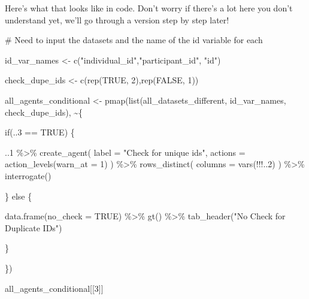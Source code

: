 \documentclass[
  letterpaper,
  DIV=11,
  numbers=noendperiod]{scrreprt}
\newenvironment{Shaded}{\begin{snugshade}}{\end{snugshade}}
\newcommand{\AttributeTok}[1]{\textcolor[rgb]{0.40,0.45,0.13}{#1}}
\newcommand{\CommentTok}[1]{\textcolor[rgb]{0.37,0.37,0.37}{#1}}
\newcommand{\ConstantTok}[1]{\textcolor[rgb]{0.56,0.35,0.01}{#1}}
\newcommand{\ControlFlowTok}[1]{\textcolor[rgb]{0.00,0.23,0.31}{#1}}
\newcommand{\DecValTok}[1]{\textcolor[rgb]{0.68,0.00,0.00}{#1}}
\newcommand{\FunctionTok}[1]{\textcolor[rgb]{0.28,0.35,0.67}{#1}}
\newcommand{\NormalTok}[1]{\textcolor[rgb]{0.00,0.23,0.31}{#1}}
\newcommand{\OtherTok}[1]{\textcolor[rgb]{0.00,0.23,0.31}{#1}}
\newcommand{\SpecialCharTok}[1]{\textcolor[rgb]{0.37,0.37,0.37}{#1}}
\newcommand{\StringTok}[1]{\textcolor[rgb]{0.13,0.47,0.30}{#1}}
\begin{document}
Here's what that looks like in code. Don't worry if there's a lot here
you don't understand yet, we'll go through a version step by step later!

\begin{Shaded}
\begin{Highlighting}[]
\CommentTok{\# Need to input the datasets and the name of the id variable for each}

\NormalTok{id\_var\_names }\OtherTok{\textless{}{-}} \FunctionTok{c}\NormalTok{(}\StringTok{"individual\_id"}\NormalTok{,}\StringTok{"participant\_id"}\NormalTok{, }\StringTok{"id"}\NormalTok{)}

\NormalTok{check\_dupe\_ids }\OtherTok{\textless{}{-}} \FunctionTok{c}\NormalTok{(}\FunctionTok{rep}\NormalTok{(}\ConstantTok{TRUE}\NormalTok{, }\DecValTok{2}\NormalTok{),}\FunctionTok{rep}\NormalTok{(}\ConstantTok{FALSE}\NormalTok{, }\DecValTok{1}\NormalTok{))}

\NormalTok{all\_agents\_conditional }\OtherTok{\textless{}{-}} \FunctionTok{pmap}\NormalTok{(}\FunctionTok{list}\NormalTok{(all\_datasets\_different, }
\NormalTok{                                    id\_var\_names, }
\NormalTok{                                    check\_dupe\_ids), }\SpecialCharTok{\textasciitilde{}}\NormalTok{\{}
  
  \ControlFlowTok{if}\NormalTok{(..}\DecValTok{3} \SpecialCharTok{==} \ConstantTok{TRUE}\NormalTok{) \{}
    
\NormalTok{    ..}\DecValTok{1} \SpecialCharTok{\%\textgreater{}\%}
    \FunctionTok{create\_agent}\NormalTok{(}
      \AttributeTok{label =} \StringTok{"Check for unique ids"}\NormalTok{,}
      \AttributeTok{actions =} \FunctionTok{action\_levels}\NormalTok{(}\AttributeTok{warn\_at =} \DecValTok{1}\NormalTok{)}
\NormalTok{    ) }\SpecialCharTok{\%\textgreater{}\%}
    \FunctionTok{rows\_distinct}\NormalTok{(}
      \AttributeTok{columns =} \FunctionTok{vars}\NormalTok{(}\SpecialCharTok{!!!}\NormalTok{..}\DecValTok{2}\NormalTok{)}
\NormalTok{    ) }\SpecialCharTok{\%\textgreater{}\%}
    \FunctionTok{interrogate}\NormalTok{()}
    
\NormalTok{  \} }\ControlFlowTok{else}\NormalTok{ \{}
    
    \FunctionTok{data.frame}\NormalTok{(}\AttributeTok{no\_check =} \ConstantTok{TRUE}\NormalTok{) }\SpecialCharTok{\%\textgreater{}\%} 
    \FunctionTok{gt}\NormalTok{() }\SpecialCharTok{\%\textgreater{}\%} 
      \FunctionTok{tab\_header}\NormalTok{(}\StringTok{"No Check for Duplicate IDs"}\NormalTok{)}
    
\NormalTok{  \}}
  
  
\NormalTok{\})}

\NormalTok{all\_agents\_conditional[[}\DecValTok{3}\NormalTok{]]}
\end{Highlighting}
\end{Shaded}
\end{document}
